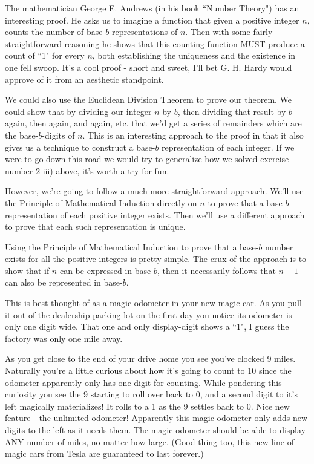 \documentclass{article}
\begin{document}
The mathematician George E. Andrews (in his book
``Number Theory") has an interesting proof.
He asks us to imagine a function that given a positive integer $n$,
counts the number of base-$b$ representations of $n$.
Then with some fairly straightforward reasoning he shows that this counting-function
MUST produce a count of ``1" for every $n$, both establishing the uniqueness 
and the existence in one fell swoop.
It's a cool proof - short and sweet, I'll bet G. H. Hardy would approve of
it from an aesthetic standpoint.

We could also use the Euclidean Division Theorem to prove our theorem.
We could show that by dividing our integer $n$ by $b$, then dividing that
result by $b$ again, then again, and again, etc. that we'd get a series
of remainders which are the base-$b$-digits of $n$.
This is an interesting approach to the proof in that it also gives us a technique
to construct a base-$b$ representation of each integer.
If we were to go down this road
we would try to generalize how we solved
exercise number 2-iii) above, it's worth a try for fun.

However, we're going to follow a much more straightforward approach.
We'll use the Principle of Mathematical Induction directly on $n$
to prove that
a base-$b$ representation of each positive integer exists.
Then we'll use a different approach to prove that each such representation is unique.

\bigskip
Using the
Principle of Mathematical Induction 
to prove that a base-$b$ number exists for all the positive integers is pretty simple.
The crux of the approach is to show that if $n$ can be expressed in base-$b$,
then it necessarily follows that $n+1$ can also be represented in base-$b$.

This is best thought of as a magic
odometer in your new magic car.
As you pull it out of the dealership parking lot
on the first day you notice its odometer is only one digit wide.
That one and only display-digit shows a ``1", I guess the factory was only one mile away.

As you get close to the end of your drive home
you see you've clocked 9 miles.
Naturally you're a little curious about how it's going to
count to 10 since the odometer apparently only has one digit for counting.
While pondering this curiosity you see the 9 starting to roll
over back to 0, and a second digit to it's left magically materializes!
It rolls to a 1 as the 9 settles back to 0.
Nice new feature - the unlimited odometer!
Apparently this magic odometer only adds new digits to the left
as it needs them.
The magic odometer should be able to display ANY number of miles, no matter how large.
(Good thing too, this
new line of magic cars from Tesla are guaranteed to last forever.)
\end{document}
